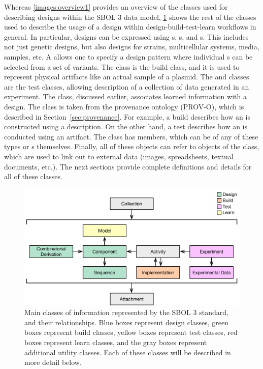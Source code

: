 Whereas \ref{images:overview1} provides an overview of the classes used for describing designs within the SBOL 3 data model,  \ref{images:overview2} shows the rest of the classes used to describe the usage of a design within design-build-test-learn workflows in general.
In particular, designs can be expressed using s, s, and s.
This includes not just genetic designs, but also designs for strains, multicellular systems, media, samples, etc.
A  allows one to specify a design pattern where individual s can be selected from a set of variants.  
The  class is the build class, and it is used to represent physical artifacts like an actual sample of a plasmid.  
The  and  classes are the test classes, allowing description of a collection of data generated in an experiment.  
The  class, discussed earlier, associates learned information with a design.
The \activity class is taken from the provenance ontology (PROV-O), which is described in Section~\ref{sec:provenance}.  For example, a build \activity describes how an  is constructed using a  description.  On the other hand, a test \activity describes how an  is conducted using an  artifact.  The  class has members, which can be of any of these types or s themselves.  
Finally, all of these objects can refer to objects of the  class, which are used to link out to external data (images, spreadsheets, textual documents, etc.). 
The next sections provide complete definitions and details for all of these classes.

\begin{figure}[ht]
\begin{center}
\includegraphics[scale=0.85]{images/SBOL3-top-levels.pdf}
\caption{Main classes of information represented by the SBOL 3 standard, and their relationships.  Blue boxes represent design classes, green boxes represent build classes, yellow boxes represent test classes, red boxes represent learn classes, and the gray boxes represent additional utility classes.  Each of these classes will be described in more detail below.}
\label{images:overview2}
\end{center}
\end{figure}
